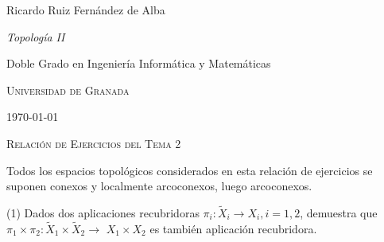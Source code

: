 \documentclass[
  a4paper,
  spanish,
  12pt,
]{scrartcl}
\begin{document}
\begin{flushright}
  Ricardo Ruiz Fernández de Alba\vspace{.5em}

  \textit{Topología II}

  Doble Grado en Ingeniería Informática y Matemáticas

  \textsc{Universidad de Granada}\vspace{.5em}

  \today\vspace{.5em}
\end{flushright}

\begin{flushleft}
  \scshape\Large Relación de Ejercicios del Tema 2
\end{flushleft}

Todos los espacios topológicos considerados en esta relación de ejercicios se suponen conexos y localmente arcoconexos, luego arcoconexos.\\

\begin{ejer}
(1) Dados dos aplicaciones recubridoras $\pi_{i}: \tilde{X}_{i} \rightarrow X_{i}, i=1,2$, demuestra que $\pi_{1} \times \pi_{2}: \tilde{X}_{1} \times \tilde{X}_{2} \rightarrow$ $X_{1} \times X_{2}$ es también aplicación recubridora.\\
\end{ejer}
\end{document}
